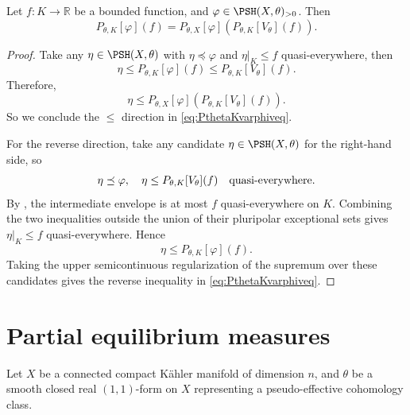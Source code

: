 \begin{corollary}\label{cor:PKtoPX}
    Let $f\colon K\rightarrow \mathbb{R}$ be a bounded function, and $\varphi\in \PSH(X,\theta)_{>0}$. Then
\begin{equation}\label{eq:PthetaKvarphiveq}
P_{\theta,K}[\varphi](f)=P_{\theta,X}[\varphi]\left( P_{\theta,K}[V_{\theta}](f) \right).
\end{equation}
\end{corollary}
\begin{proof}
Take any $\eta\in \PSH(X,\theta)$ with $\eta\preceq \varphi$ and $\eta|_K\leq f$ quasi-everywhere, then
\[
\eta\leq P_{\theta,K}[\varphi](f)\leq P_{\theta,K}[V_{\theta}](f).
\]
Therefore,
\[
\eta\leq P_{\theta,X}[\varphi]\left( P_{\theta,K}[V_{\theta}](f) \right).
\]
So we conclude the $\leq$ direction in \eqref{eq:PthetaKvarphiveq}.

For the reverse direction, take any candidate $\eta\in \PSH(X,\theta)$ for the right-hand side, so
\[
\eta\preceq \varphi,\quad \eta\leq P_{\theta,K}[V_{\theta}](f) \quad \textup{quasi-everywhere}.
\]
By , the intermediate envelope is at most $f$ quasi-everywhere on $K$. Combining the two inequalities outside the union of their pluripolar exceptional sets gives $\eta|_K\leq f$ quasi-everywhere. Hence
\[
\eta\leq P_{\theta,K}[\varphi](f).
\]
Taking the upper semicontinuous regularization of the supremum over these candidates gives the reverse inequality in \eqref{eq:PthetaKvarphiveq}.
\end{proof}

\section{Partial equilibrium measures}\label{sec:pem}
Let $X$ be a connected compact Kähler manifold of dimension $n$, and $\theta$ be a smooth closed real $(1,1)$-form on $X$ representing a pseudo-effective cohomology class.

